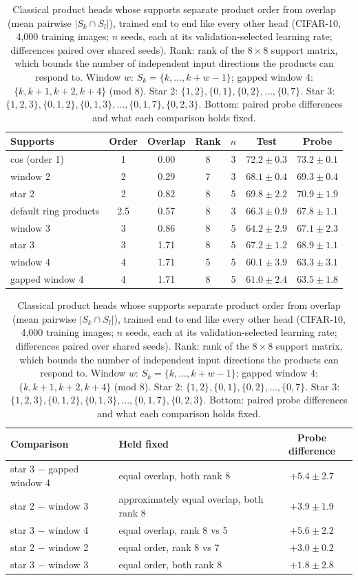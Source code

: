 \begin{table}[h]
\centering
\caption{Classical product heads whose supports separate product order from overlap (mean
pairwise $|S_k\cap S_l|$), trained end to end like every other head (CIFAR-10, 4,000 training
images; $n$ seeds, each at its validation-selected learning rate; differences paired over shared seeds). Rank: rank of the $8\times8$
support matrix, which bounds the number of independent input directions the products can
respond to. Window $w$: $S_k=\{k,\dots,k{+}w{-}1\}$; gapped window 4: $\{k,k{+}1,k{+}2,k{+}4\}$
(mod 8). Star 2: $\{1,2\},\{0,1\},\{0,2\},\dots,\{0,7\}$. Star 3: $\{1,2,3\},
\{0,1,2\},\{0,1,3\},\dots,\{0,1,7\},\{0,2,3\}$. Bottom: paired probe differences and what each
comparison holds fixed.}
\label{tab:support}
\small
\begin{tabular}{lcccccc}
\toprule
Supports & Order & Overlap & Rank & $n$ & Test & Probe \\
\midrule
cos (order 1) & 1 & 0.00 & 8 & 3 & $72.2 \pm 0.3$ & $73.2 \pm 0.1$ \\
window 2 & 2 & 0.29 & 7 & 3 & $68.1 \pm 0.4$ & $69.3 \pm 0.4$ \\
star 2 & 2 & 0.82 & 8 & 5 & $69.8 \pm 2.2$ & $70.9 \pm 1.9$ \\
default ring products & 2.5 & 0.57 & 8 & 3 & $66.3 \pm 0.9$ & $67.8 \pm 1.1$ \\
window 3 & 3 & 0.86 & 8 & 5 & $64.2 \pm 2.9$ & $67.1 \pm 2.3$ \\
star 3 & 3 & 1.71 & 8 & 5 & $67.2 \pm 1.2$ & $68.9 \pm 1.1$ \\
window 4 & 4 & 1.71 & 5 & 5 & $60.1 \pm 3.9$ & $63.3 \pm 3.1$ \\
gapped window 4 & 4 & 1.71 & 8 & 5 & $61.0 \pm 2.4$ & $63.5 \pm 1.8$ \\
\bottomrule
\end{tabular}

\vspace{4pt}
\begin{tabular}{llc}
\toprule
Comparison & Held fixed & Probe difference \\
\midrule
star 3 $-$ gapped window 4 & equal overlap, both rank 8 & $+5.4 \pm 2.7$ \\
star 2 $-$ window 3 & approximately equal overlap, both rank 8 & $+3.9 \pm 1.9$ \\
star 3 $-$ window 4 & equal overlap, rank 8 vs 5 & $+5.6 \pm 2.2$ \\
star 2 $-$ window 2 & equal order, rank 8 vs 7 & $+3.0 \pm 0.2$ \\
star 3 $-$ window 3 & equal order, both rank 8 & $+1.8 \pm 2.8$ \\
\bottomrule
\end{tabular}
\end{table}
